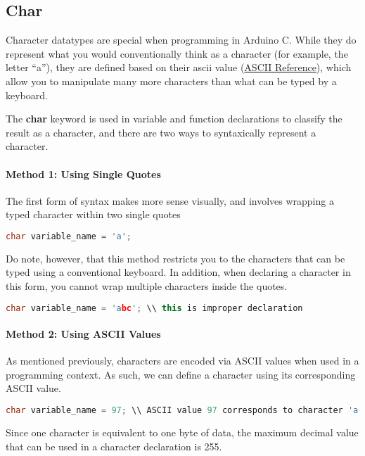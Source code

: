     \subsection{Char}
    Character datatypes are special when programming in Arduino C. While they do represent what you would conventionally think as a character (for example, the letter \enquote{a}),
    they are defined based on their ascii value (\href{https://en.cppreference.com/w/cpp/language/ascii}{ASCII Reference}), which allow you to manipulate many more characters than
    what can be typed by a keyboard.

    The \textbf{char} keyword is used in variable and function declarations to classify the result as a character, and there are two ways to syntaxically represent a character.
    \paragraph*{Method 1: Using Single Quotes} The first form of syntax makes more sense visually, and involves wrapping a typed character within two single quotes
    \begin{lstlisting}[linewidth=1.5\textwidth, language=C++]
        char variable_name = 'a';\end{lstlisting}
    Do note, however, that this method restricts you to the characters that can be typed using a conventional keyboard. In addition, when declaring a character in this form, you
    cannot wrap multiple characters inside the quotes.
    \begin{lstlisting}[linewidth=1.5\textwidth, language=C++]
        char variable_name = 'abc'; \\ this is improper declaration \end{lstlisting}
    \paragraph*{Method 2: Using ASCII Values} As mentioned previously, characters are encoded via ASCII values when used in a programming context. As such, we can define a
    character using its corresponding ASCII value.
    \begin{lstlisting}[linewidth=1.5\textwidth, language=C++]
        char variable_name = 97; \\ ASCII value 97 corresponds to character 'a'\end{lstlisting}
    Since one character is equivalent to one byte of data, the maximum decimal value that can be used in a character declaration is 255.

